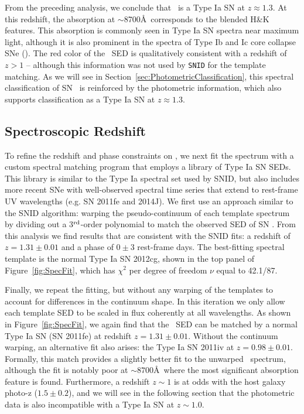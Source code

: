 From the preceding analysis, we conclude that \tomas\ is a Type Ia SN
at $z\approx1.3$.  At this redshift, the absorption at $\sim$8700\AA\
corresponds to the blended  H\&K features.
This \ion{Ca}{2} absorption is commonly seen in Type Ia SN spectra
near maximum light, although it is also prominent in the spectra of
Type Ib and Ic core collapse SNe (\CCSNe).  The red color of
the \tomas\ SED is qualitatively consistent with a redshift of $z>1$
-- although this information was not used by {\tt SNID} for the
template matching.  As we will see in Section~\ref{sec:PhotometricClassification},
this spectral classification of SN \tomas\ is reinforced by the
photometric information, which also supports classification as a Type
Ia SN at $z\approx1.3$.


\subsection{Spectroscopic Redshift}
\label{sec:SpecRedshift}

To refine the redshift and phase constraints on \tomas, we next fit
the spectrum with a custom spectral matching program that employs a
library of Type Ia SN SEDs.  This library is similar to the Type Ia
spectral set used by SNID, but also includes more recent SNe with
well-observed spectral time series that extend to rest-frame UV
wavelengths (e.g. SN 2011fe and 2014J).  We first use an approach
similar to the SNID algorithm: warping the pseudo-continuum of each
template spectrum by dividing out a 3$^{\rm rd}$-order polynomial to
match the observed SED of SN \tomas.  From this analysis we find
results that are consistent with the SNID fits: a redshift of
$z=1.31\pm0.01$ and a phase of $0\pm3$ rest-frame days. The
best-fitting spectral template is the normal Type Ia SN 2012cg, shown
in the top panel of Figure~\ref{fig:SpecFit}, which has $\chi^2$
per degree of freedom $\nu$ equal to 42.1/87.

Finally, we repeat the fitting, but without any warping of the
templates to account for differences in the continuum shape.  In this
iteration we only allow each template SED to be scaled in flux
coherently at all wavelengths.  As shown in Figure~\ref{fig:SpecFit},
we again find that the \tomas\ SED can be matched by a normal Type Ia
SN (SN 2011fe) at redshift $z=1.31\pm0.01$.  Without the continuum
warping, an alternative fit also arises: the \change{fast-declining
(91bg-like)} Type Ia SN 2011iv
at $z=0.98\pm0.01$. Formally, this match provides a slightly better
fit to the unwarped \tomas\ spectrum, although the fit is notably poor
at $\sim8700$\AA\ where the most significant absorption feature is
found. Furthermore, a redshift $z\sim1$ is at odds with the host
galaxy photo-z ($1.5\pm0.2$), and we will see in the following section
that the photometric data is also incompatible with a Type Ia SN at
$z\sim1.0$.

